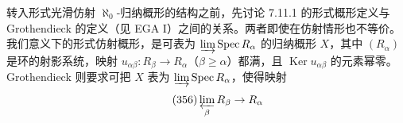  转入形式光滑仿射 $\aleph_0$-归纳概形的结构之前，先讨论 7.11.1 的形式概形定义与 Grothendieck 的定义（见 EGA I）之间的关系。两者即使在仿射情形也不等价。我们意义下的形式仿射概形，是可表为 $\varinjlim\operatorname{Spec}R_\alpha$ 的归纳概形 $X$，其中 $(R_\alpha)$ 是环的射影系统，映射 $u_{\alpha\beta}:R_\beta\to R_\alpha$（$\beta\ge\alpha$）都满，且 $\operatorname{Ker}u_{\alpha\beta}$ 的元素幂零。Grothendieck 则要求可把 $X$ 表为 $\varinjlim\operatorname{Spec}R_\alpha$，使得映射
\begin{equation}\tag{356}
\varprojlim_\beta R_\beta\to R_\alpha
\end{equation}
